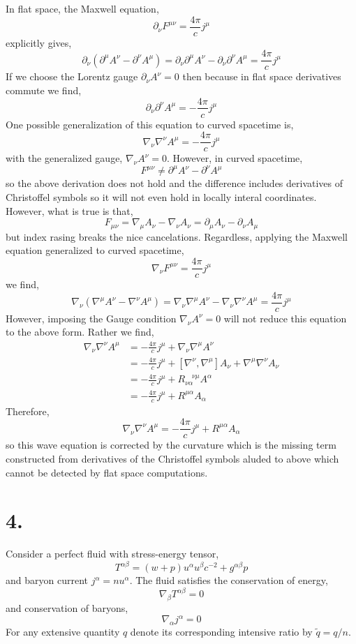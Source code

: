 \documentclass[12pt]{article}
\begin{document}
In flat space, the Maxwell equation,
\[ \partial_\nu F^{\mu \nu} = \frac{4 \pi}{c} j^\mu \]
explicitly gives,
\[ \partial_\nu (\partial^\mu A^\nu - \partial^\nu A^\mu) = \partial_\nu \partial^\mu A^\nu - \partial_\nu \partial^\nu A^\mu = \frac{4 \pi}{c} j^\mu \]
If we choose the Lorentz gauge $\partial_\nu A^\nu = 0$ then because in flat space derivatives commute we find,
\[ \partial_\nu \partial^\nu A^\mu = - \frac{4 \pi}{c} j^\mu \]
One possible generalization of this equation to curved spacetime is,
\[ \nabla_\nu \nabla^\nu A^\mu = - \frac{4 \pi}{c} j^\mu \]
with the generalized gauge, $\nabla_\nu A^\nu = 0$. However, in curved spacetime,
\[ F^{\mu \nu} \neq \partial^\mu A^\nu - \partial^\nu A^\mu \]
so the above derivation does not hold and the difference includes derivatives of Christoffel symbols so it will not even hold in locally interal coordinates. However, what is true is that,
\[ F_{\mu \nu} = \nabla_\mu A_\nu - \nabla_\nu A_\nu = \partial_\mu A_\nu - \partial_\nu A_\mu \]
but index rasing breaks the nice cancelations. Regardless, applying the Maxwell equation generalized to curved spacetime,
\[ \nabla_\nu F^{\mu \nu} = \frac{4 \pi}{c} j^\mu \]
we find,
\[ \nabla_\nu (\nabla^\mu A^\nu - \nabla^\nu A^\mu) = \nabla_\nu \nabla^\mu A^\nu - \nabla_\nu \nabla^\nu A^\mu = \frac{4 \pi}{c} j^\mu \]
However, imposing the Gauge condition $\nabla_\nu A^\nu = 0$ will not reduce this equation to the above form. Rather we find,
\begin{align*}
\nabla_\nu \nabla^\nu A^\mu & = - \frac{4 \pi}{c} j^\mu + \nabla_\nu \nabla^\mu A^\nu 
\\
& = - \frac{4 \pi}{c} j^\mu + [\nabla^\nu, \nabla^\mu] A_\nu + \nabla^\mu \nabla^\nu A_\nu 
\\
& = - \frac{4 \pi}{c} j^\mu + R^{\quad \nu \mu}_{\nu \alpha} A^\alpha
\\
& = - \frac{4 \pi}{c} j^\mu + R^{\mu \alpha} A_\alpha
\end{align*}
Therefore,
\[ \nabla_\nu \nabla^\nu A^\mu = - \frac{4 \pi}{c} j^\mu + R^{\mu \alpha} A_\alpha \]
so this wave equation is corrected by the curvature which is the missing term constructed from derivatives of the Christoffel symbols aluded to above which cannot be detected by flat space computations. 

\section*{4. }

Consider a perfect fluid with stress-energy tensor,
\[ T^{\alpha \beta} = (w + p) u^\alpha u^\beta c^{-2} + g^{\alpha \beta} p \]
and baryon current $j^\alpha = n u^\alpha$. The fluid satisfies the conservation of energy,
\[ \nabla_\beta T^{\alpha \beta} = 0 \]
and conservation of baryons,
\[ \nabla_\alpha j^\alpha = 0 \]
For any extensive quantity $q$ denote its corresponding intensive ratio by $\tilde{q} = q/n$.
\end{document}
